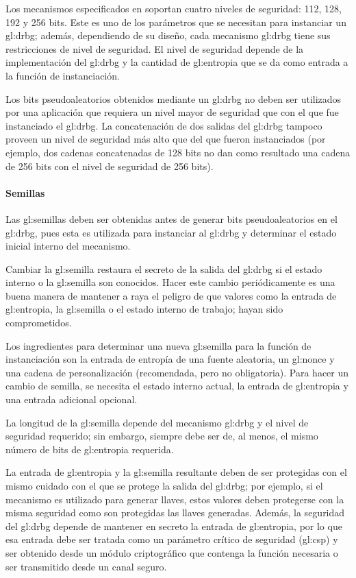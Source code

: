 Los mecanismos especificados en \cite{nist_aleatorios} soportan cuatro niveles
de seguridad: 112, 128, 192 y 256 bits. Este es uno de los parámetros que
se necesitan para instanciar un \gls{gl:drbg}; además, dependiendo de su diseño,
cada mecanismo  \gls{gl:drbg} tiene sus restricciones de nivel de seguridad.
El nivel de seguridad depende de la implementación del \gls{gl:drbg} y la
cantidad de \gls{gl:entropia} que se da como entrada a la función de
instanciación.

Los bits pseudoaleatorios obtenidos mediante un \gls{gl:drbg} no deben ser
utilizados por una aplicación que requiera un nivel mayor de seguridad que con
el que fue instanciado el \gls{gl:drbg}. La concatenación de dos salidas del
\gls{gl:drbg} tampoco proveen un nivel de seguridad más alto que del que fueron
instanciados (por ejemplo, dos cadenas concatenadas de 128 bits no dan como
resultado una cadena de 256 bits con el nivel de seguridad de 256 bits).

\paragraph{Semillas}
Las \glspl{gl:semilla} deben ser obtenidas antes de generar bits
pseudoaleatorios en el \gls{gl:drbg}, pues esta es utilizada para instanciar al
\gls{gl:drbg} y determinar el estado inicial interno del mecanismo.

Cambiar la \gls{gl:semilla} restaura el secreto de la salida del \gls{gl:drbg}
si el estado interno o la \gls{gl:semilla} son conocidos. Hacer este cambio
periódicamente es una buena manera de mantener a raya el peligro de que valores
como la entrada de \gls{gl:entropia}, la \gls{gl:semilla} o el estado interno
de trabajo; hayan sido comprometidos.

Los ingredientes para determinar una nueva \gls{gl:semilla} para la función de
instanciación son la entrada de entropía de una fuente aleatoria, un
\gls{gl:nonce} y una cadena de personalización (recomendada, pero no
obligatoria). Para hacer un cambio de semilla, se necesita el estado interno
actual, la entrada de \gls{gl:entropia} y una entrada adicional opcional.

La longitud de la \gls{gl:semilla} depende del mecanismo \gls{gl:drbg} y el
nivel de seguridad requerido; sin embargo, siempre debe ser de, al menos, el
mismo número de bits de \gls{gl:entropia} requerida.

La entrada de \gls{gl:entropia} y la \gls{gl:semilla} resultante deben de ser
protegidas con el mismo cuidado con el que se protege la salida del
\gls{gl:drbg}; por ejemplo, si el mecanismo es utilizado para generar llaves,
estos valores deben protegerse con la misma seguridad como son protegidas las
llaves generadas. Además, la seguridad del \gls{gl:drbg} depende de mantener
en secreto la entrada de \gls{gl:entropia}, por lo que esa entrada debe ser
tratada como un parámetro crítico de seguridad (\gls{gl:csp}) y ser obtenido
desde un módulo criptográfico que contenga la función necesaria o ser
transmitido desde un canal seguro.

